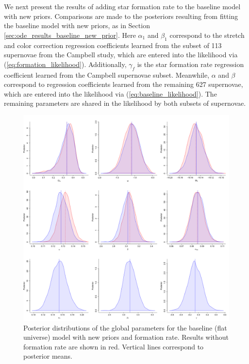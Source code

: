 We next present the results of adding star formation rate to the baseline model with new priors. Comparisons are made to the posteriors resulting from fitting the baseline model with new priors, as in Section \ref{sec:ode_results_baseline_new_prior}. Here $\alpha_1$ and $\beta_1$ correspond to the stretch and color correction regression coefficients learned from the subset of 113 supernovae from the Campbell study, which are entered into the likelihood via (\ref{eq:formation_likelihood}). Additionally, $\gamma_{f}$ is the star formation rate regression coefficient learned from the Campbell supernovae subset. Meanwhile, $\alpha$ and $\beta$ correspond to regression coefficients learned from the remaining 627 supernovae, which are entered into the likelihood via (\ref{eq:baseline_likelihood}). The remaining parameters are shared in the likelihood by both subsets of supernovae. 

\begin{figure}
\centering
	\includegraphics[width=\textwidth]{figures/ode/split_rate_flat_camp.png}
\caption{Posterior distributions of the global parameters for the baseline (flat universe) model with new priors and formation rate. Results without formation rate are shown in red. Vertical lines correspond to posterior means.}
\label{fig:ode_rate_flat}
\end{figure}

